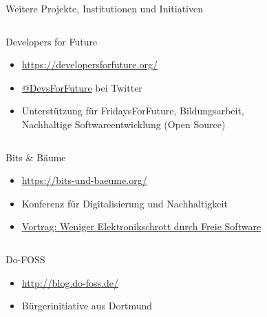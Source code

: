 \documentclass[t]{beamer}
\begin{document}
\begin{frame}{Weitere Projekte, Institutionen und Initiativen}
    \begin{columns}[T]
        \begin{column}{0.78\textwidth}
            \begin{block}{Developers for Future}
                \begin{itemize}
                    \item \url{https://developersforfuture.org/}
                    \item
                        \href{https://twitter.com/DevsForFuture}{@DevsForFuture}
                        bei Twitter
                    \item Unterstützung für FridaysForFuture, Bildungsarbeit, \\
                        Nachhaltige Softwareentwicklung (Open Source)
                \end{itemize}
            \end{block}
        \end{column}
        \begin{column}{0.2\textwidth}
        \end{column}
    \end{columns}
    \begin{columns}[T]
        \begin{column}{0.82\textwidth}
            \begin{block}{Bits \& Bäume}
                \begin{itemize}
                    \item \url{https://bits-und-baeume.org/}
                    \item Konferenz für Digitalisierung und Nachhaltigkeit
                    \item \href{https://fahrplan.bits-und-baeume.org/events/205.html}{Vortrag: Weniger Elektronikschrott durch Freie Software}
                \end{itemize}
            \end{block}
        \end{column}
        \begin{column}{0.16\textwidth}
        \end{column}
    \end{columns}
    \begin{block}{Do-FOSS}
        \begin{itemize}
            \item \url{http://blog.do-foss.de/}
            \item Bürgerinitiative aus Dortmund
        \end{itemize}
    \end{block}
\end{frame}
\end{document}
